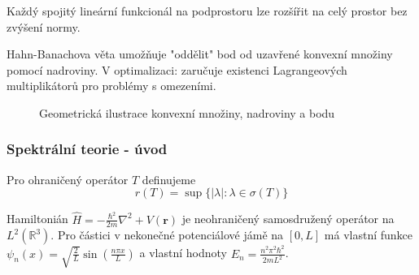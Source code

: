 \begin{theorem}
Každý spojitý lineární funkcionál na podprostoru lze rozšířit na celý prostor bez zvýšení normy.
\end{theorem}

\begin{intuition}
Hahn-Banachova věta umožňuje "oddělit" bod od uzavřené konvexní množiny pomocí nadroviny. V optimalizaci: zaručuje existenci Lagrangeových multiplikátorů pro problémy s omezeními.
\end{intuition}

\begin{figure}[htbp]
    \centering
    \caption{Geometrická ilustrace konvexní množiny, nadroviny a bodu}
    \label{fig:convex_plane_point}
    \end{figure}

\subsubsection{Spektrální teorie - úvod}

\begin{definition}
Pro ohraničený operátor $T$ definujeme
\[
r(T) = \sup\{|\lambda| : \lambda \in \sigma(T)\}
\]
\end{definition}

\begin{example}
Hamiltonián $\hat{H} = -\frac{\hbar^2}{2m}\nabla^2 + V(\mathbf{r})$ je neohraničený samosdružený operátor na $L^2(\mathbb{R}^3)$. Pro částici v nekonečné potenciálové jámě na $[0,L]$ má vlastní funkce $\psi_n(x) = \sqrt{\frac{2}{L}}\sin(\frac{n\pi x}{L})$ a vlastní hodnoty $E_n = \frac{n^2\pi^2\hbar^2}{2mL^2}$.
\end{example}

